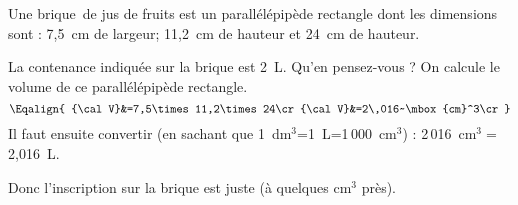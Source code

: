 Une \og brique\fg\ de jus de fruits est un parallélépipède rectangle dont les dimensions sont : 7,5~cm de largeur; 11,2~cm de hauteur et 24~cm de hauteur.
\par La contenance indiquée sur la brique est 2~L. Qu'en pensez-vous ?
On calcule le volume de ce parallélépipède rectangle.
\[
\Eqalign{
{\cal V}&=7,5\times11,2\times24\cr
{\cal V}&=2\,016~\mbox{cm}^3\cr
}
\]
Il faut ensuite convertir (en sachant que 1~dm$^3$=1~L=1\,000~cm$^3$) : 2\,016~cm$^3=$2,016~L.
\par Donc l'inscription sur la brique est juste (à quelques cm$^3$ près).